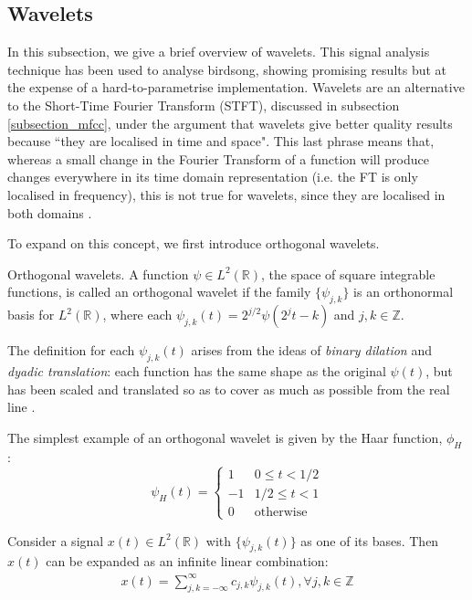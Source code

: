 \documentclass[../main.tex]{subfiles} \label{chapter_soa}
\begin{document}
\subsection{Wavelets} \label{subsection_wavelets}
In this subsection, we give a brief overview of wavelets. This signal analysis technique has been used to analyse birdsong, showing promising results \cite{Chou2009} but at the expense of a hard-to-parametrise implementation. Wavelets are an alternative to the Short-Time Fourier Transform (STFT), discussed in subsection \ref{subsection_mfcc}, under the argument that wavelets give better quality results because ``they are localised in time and space". This last phrase means that, whereas a small change in the Fourier Transform of a function will produce changes everywhere in its time domain representation (i.e. the FT is only localised in frequency), this is not true for wavelets, since they are localised in both domains \cite{Vidakovic1991}.
\par To expand on this concept, we first introduce orthogonal wavelets.
\begin{definition}{Orthogonal wavelets.} \label{def_onwavelets}
A function $\psi\in L^2(\mathbb{R})$, the space of square integrable functions, is called an orthogonal wavelet if the family $\{\psi_{j,k}\}$ is an orthonormal basis for $L^2(\mathbb{R})$, where each $\psi_{j,k}(t) = 2^{j/2}\psi(2^jt-k)$ and $j, k \in \mathbb{Z}$.
\end{definition}
\par The definition for each $\psi_{j,k}(t)$ arises from the ideas of \emph{binary dilation} and \emph{dyadic translation}: each function has the same shape as the original $\psi(t)$, but has been scaled and translated so as to cover as much as possible from the real line \cite{Chui1992}. 
\par The simplest example of an orthogonal wavelet is given by the Haar function, $\phi_H$ \cite{Chui1992}:
\begin{displaymath}
   \psi_H(t) = \left\{
     \begin{array}{lr}
      1 & 0 \leq t < 1/2 \\
      -1 & 1/2 \leq t < 1 \\
      0 & \text{otherwise} 
     \end{array}
   \right.
\end{displaymath}
\par Consider a signal $x(t) \in L^2(\mathbb{R})$ with $\{\psi_{j,k}(t)\}$ as one of its bases. Then $x(t)$ can be expanded as an infinite linear combination:
\begin{align*}
x(t) = \sum_{j,k=-\infty}^{\infty}{c_{j,k}\psi_{j,k}(t)}, \forall j,k \in \mathbb{Z}
\end{align*}
\end{document}

